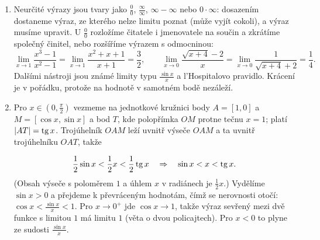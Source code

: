 \begin{enumerate}[label=\textbf{\arabic*.}, leftmargin=*, itemsep=0.8em]
  \item {}
  Neurčité výrazy jsou tvary jako $\frac{0}{0}$, $\frac{\infty}{\infty}$, $\infty - \infty$ nebo $0\cdot\infty$: dosazením dostaneme výraz, ze kterého nelze limitu poznat (může vyjít cokoli), a výraz musíme upravit. U $\frac{0}{0}$ rozložíme čitatele i jmenovatele na součin a zkrátíme společný činitel, nebo rozšíříme výrazem s odmocninou:
  \begin{equation*}
    \lim_{x\to 1}\frac{x^3 - 1}{x^2 - 1} = \lim_{x\to 1}\frac{x^2 + x + 1}{x + 1} = \frac{3}{2}, \qquad \lim_{x\to 0}\frac{\sqrt{x + 4} - 2}{x} = \lim_{x\to 0}\frac{1}{\sqrt{x + 4} + 2} = \frac{1}{4}.
  \end{equation*}
  Dalšími nástroji jsou známé limity typu $\frac{\sin x}{x}$ a l'Hospitalovo pravidlo. Krácení je v pořádku, protože na hodnotě v samotném bodě nezáleží. 

  \item {}
  Pro $x\in\left(0, \frac{\pi}{2}\right)$ vezmeme na jednotkové kružnici body $A = [1, 0]$ a $M = [\cos x, \sin x]$ a bod $T$, kde polopřímka $OM$ protne tečnu $x = 1$; platí $|AT| = \operatorname{tg} x$. Trojúhelník $OAM$ leží uvnitř výseče $OAM$ a ta uvnitř trojúhelníku $OAT$, takže
  \begin{center}
  \end{center}
  \begin{equation*}
    \frac{1}{2}\sin x < \frac{1}{2}x < \frac{1}{2}\operatorname{tg} x \quad\Rightarrow\quad \sin x < x < \operatorname{tg} x.
  \end{equation*}
  (Obsah výseče s poloměrem $1$ a úhlem $x$ v radiánech je $\frac{1}{2}x$.) Vydělíme $\sin x > 0$ a přejdeme k převráceným hodnotám, čímž se nerovnosti otočí: $\cos x < \frac{\sin x}{x} < 1$. Pro $x\to 0^+$ jde $\cos x\to 1$, takže výraz sevřený mezi dvě funkce s limitou $1$ má limitu $1$ (věta o dvou policajtech). Pro $x < 0$ to plyne ze sudosti $\frac{\sin x}{x}$. 


\end{enumerate}
